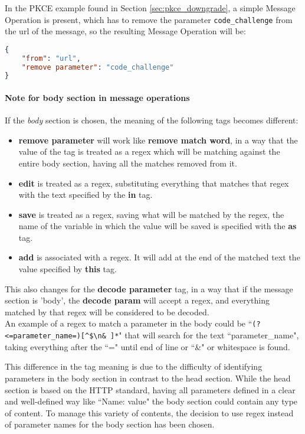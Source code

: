 In the \gls{PKCE} example found in Section \ref{sec:pkce_downgrade}, a simple Message Operation is present, which has to remove the parameter \texttt{code\_challenge} from the url of the message, so the resulting Message Operation will be:
\begin{lstlisting}[language=json, caption=Message Operation definition]
{
    "from": "url",
    "remove parameter": "code_challenge"
}
\end{lstlisting}

\paragraph{Note for body section in message operations}
If the \textit{body} section is chosen, the meaning of the following tags becomes different:
\begin{itemize}
    \item \textbf{remove parameter} will work like \textbf{remove match word}, in a way that the value of the tag is treated as a regex which will be matching against the entire body section, having all the matches removed from it.
    \item \textbf{edit} is treated as a regex, substituting everything that matches that regex with the text specified by the \textbf{in} tag.
    \item \textbf{save} is treated as a regex, saving what will be matched by the regex, the name of the variable in which the value will be saved is specified with the \textbf{as} tag.
    \item \textbf{add} is associated with a regex. It will add at the end of the matched text the value specified by \textbf{this} tag.
\end{itemize}

This also changes for the \textbf{decode parameter} tag, in a way that if the message section is 'body', the \textbf{decode param} will accept a regex, and everything matched by that regex will be considered to be decoded. \\ An example of a regex to match a parameter in the body could be ``\verb|(?<=parameter_name=)[^$\n& ]*|" that will search for the text ``parameter\_name", taking everything after the ``=" until end of line or ``\&" or whitespace is found.

This difference in the tag meaning is due to the difficulty of identifying parameters in the body section in contrast to the head section. While the head section is based on the HTTP standard, having all parameters defined in a clear and well-defined way like ``Name: value" the body section could contain any type of content. To manage this variety of contents, the decision to use regex instead of parameter names for the body section has been chosen.

